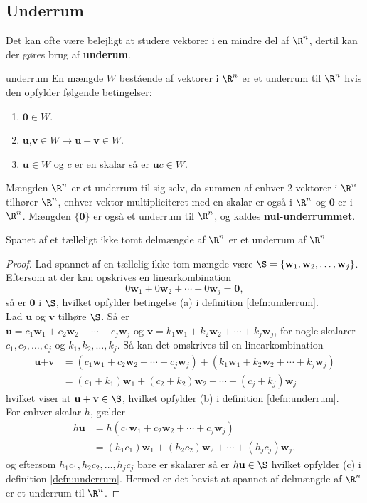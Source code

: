 \subsection{Underrum}
Det kan ofte være belejligt at studere vektorer i en mindre del af $\R^n$, dertil kan der gøres brug af \textbf{underum}.
\begin{defn}{}{underrum}
En mængde $W$ bestående af vektorer i $\R^n$ er et underrum til $\R^n$ hvis den opfylder følgende betingelser:	
\begin{enumerate}[label=(\alph*)]
	\item  $\textbf{0}\in W$.
	\item $\textbf{u}$,$\textbf{v} \in W \rightarrow \textbf{u}+\textbf{v} \in W $.
	\item $\textbf{u} \in W$ og $c$ er en skalar så er $\textbf{u}c \in W$.
\end{enumerate}
\end{defn}
\noindent
Mængden $\R^n$ er et underrum til sig selv, da summen af enhver 2 vektorer i $\R^n$ tilhører $\R^n$, enhver vektor multipliciteret med en skalar er også i $\R^n$ og $\textbf{0}$ er i $\R^n$. Mængden $\{\textbf{0}\}$ er også et underrum til $\R^n$, og kaldes \textbf{nul-underrummet}.


\begin{thm}{}{}
Spanet af et tælleligt ikke tomt delmængde af $\R^n$ er et underrum af $\R^n$
\end{thm}
\begin{proof}
Lad spannet af en tællelig ikke tom mængde være 
$\S=\{\textbf{w}_1 , \textbf{w}_2 , \ldots , \textbf{w}_j\}$.
Eftersom at der kan opskrives en linearkombination $$0\textbf{w}_1 + 0\textbf{w}_2 + \cdots + 0\textbf{w}_j=\textbf{0},$$ så er $\textbf{0}$ i  $\S$, hvilket opfylder betingelse (a) i definition \ref{defn:underrum}.\\
Lad $\textbf{u}$ og $\textbf{v}$ tilhøre $\S$. Så er\\
$\textbf{u}=c_1\textbf{w}_1+c_2\textbf{w}_2+\cdots+c_j\textbf{w}_j$ og $\textbf{v}=k_1\textbf{w}_1+k_2\textbf{w}_2+\cdots+k_j\textbf{w}_j$, for nogle skalarer $c_1,c_2,\ldots,c_j$ og $k_1,k_2,\ldots,k_j$. Så kan det omskrives til en linearkombination
\begin{align*}
\textbf{u}+\textbf{v}&=(c_1\textbf{w}_1+c_2\textbf{w}_2+\cdots+c_j\textbf{w}_j)+(k_1\textbf{w}_1+k_2\textbf{w}_2+\cdots+k_j\textbf{w}_j)\\
&=(c_1+k_1)\textbf{w}_1+(c_2+k_2)\textbf{w}_2+\cdots+(c_j+k_j)\textbf{w}_j
\end{align*}
hvilket viser at $\textbf{u}+\textbf{v}\in \S$, hvilket opfylder (b) i definition \ref{defn:underrum}.\\
For enhver skalar $h$, gælder
\begin{align*}
h\textbf{u}&=h(c_1\textbf{w}_1+c_2\textbf{w}_2+\cdots+c_j\textbf{w}_j)\\
&=(h_1c_1)\textbf{w}_1+(h_2c_2)\textbf{w}_2+\cdots+(h_jc_j)\textbf{w}_j,
\end{align*}
og eftersom $h_1c_1,h_2c_2,\ldots,h_jc_j$ bare er skalarer så er $h\textbf{u}\in \S$ hvilket opfylder (c) i definition \ref{defn:underrum}.
Hermed er det bevist at spannet af delmængde af $\R^n$ er et underrum til $\R^n$.
\end{proof}


